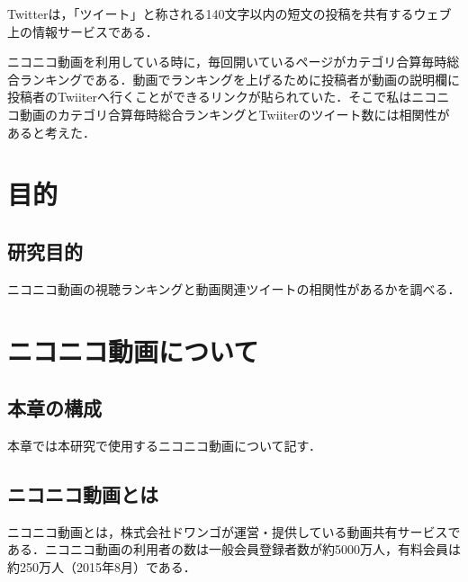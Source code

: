 Twitterは，「ツイート」と称される140文字以内の短文の投稿を共有するウェブ上の情報サービスである．

ニコニコ動画を利用している時に，毎回開いているページがカテゴリ合算毎時総合ランキングである．動画でランキングを上げるために投稿者が動画の説明欄に投稿者のTwiiterへ行くことができるリンクが貼られていた．そこで私はニコニコ動画のカテゴリ合算毎時総合ランキングとTwiiterのツイート数には相関性があると考えた．

\chapter{目的}

\section{研究目的}

ニコニコ動画の視聴ランキングと動画関連ツイートの相関性があるかを調べる．



\chapter{ニコニコ動画について}


\section{本章の構成}

本章では本研究で使用するニコニコ動画について記す．


\section{ニコニコ動画とは}
ニコニコ動画とは，株式会社ドワンゴが運営・提供している動画共有サービスである．ニコニコ動画の利用者の数は一般会員登録者数が約5000万人，有料会員は約250万人（2015年8月）である\cite{iii}．


